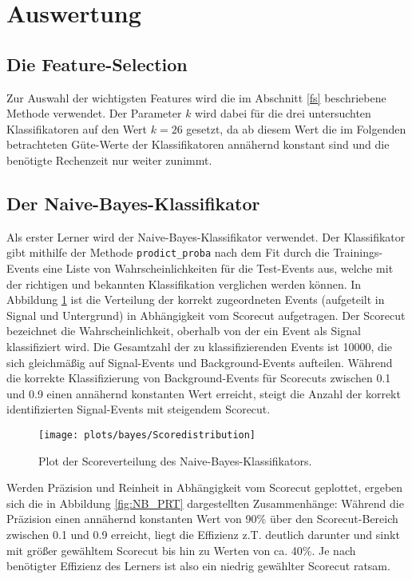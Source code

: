 \section{Auswertung}


\subsection{Die Feature-Selection}

Zur Auswahl der wichtigsten Features wird die im Abschnitt \ref{fs} beschriebene Methode verwendet. Der Parameter $k$ wird dabei für die drei untersuchten Klassifikatoren auf den Wert $k = 26$ gesetzt, da ab diesem Wert die im Folgenden betrachteten Güte-Werte der Klassifikatoren annähernd konstant sind und die benötigte Rechenzeit nur weiter zunimmt.


\subsection{Der Naive-Bayes-Klassifikator}

Als erster Lerner wird der Naive-Bayes-Klassifikator verwendet. Der Klassifikator gibt mithilfe der Methode \texttt{prodict\_proba} nach dem Fit durch die Trainings-Events eine Liste von Wahrscheinlichkeiten für die Test-Events aus, welche mit der richtigen und bekannten Klassifikation verglichen werden können. In Abbildung \ref{fig:NB_SD} ist die Verteilung der korrekt zugeordneten Events (aufgeteilt in Signal und Untergrund) in Abhängigkeit vom Scorecut aufgetragen. Der Scorecut bezeichnet die Wahrscheinlichkeit, oberhalb von der ein Event als Signal klassifiziert wird. Die Gesamtzahl der zu klassifizierenden Events ist 10000, die sich gleichmäßig auf Signal-Events und Background-Events aufteilen. Während die korrekte Klassifizierung von Background-Events für Scorecuts zwischen 0.1 und 0.9 einen annähernd konstanten Wert erreicht, steigt die Anzahl der korrekt identifizierten Signal-Events mit steigendem Scorecut.

\begin{figure}
	\centering
	\texttt{[image: plots/bayes/Scoredistribution]}
	\caption{Plot der Scoreverteilung des Naive-Bayes-Klassifikators.}
	\label{fig:NB_SD}
\end{figure}

Werden Präzision und Reinheit in Abhängigkeit vom Scorecut geplottet, ergeben sich die in Abbildung \ref{fig:NB_PRT} dargestellten Zusammenhänge: Während die Präzision einen annähernd konstanten Wert von 90\% über den Scorecut-Bereich zwischen 0.1 und 0.9 erreicht, liegt die Effizienz z.T. deutlich darunter und sinkt mit größer gewähltem Scorecut bis hin zu Werten von ca. 40\%. Je nach benötigter Effizienz des Lerners ist also ein niedrig gewählter Scorecut ratsam.

